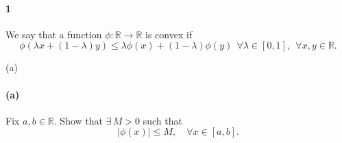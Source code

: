 \documentclass[12pt]{article}
\newenvironment{fullbox}{\begin{lrbox}{\savefullbox}\begin{minipage}{\dimexpr\textwidth-2\fboxsep\relax}}{\end{minipage}\end{lrbox}\begin{center}\framebox[\textwidth]{\usebox{\savefullbox}}\end{center}}
\newenvironment{pbox}[1][]{\begin{fullbox}\ifx#1\empty\else\paragraph{#1}\fi}{\end{fullbox}}
\theoremstyle{definition}
\newcommand{\R}{\mathbb{R}}
\begin{document}
\thispagestyle{title}


\begin{pbox}[1]
    We say that a function $\phi:\mathbb{R} \to \mathbb{R}$ is convex if
    \begin{equation}
     \phi(\lambda x + (1-\lambda)y) \le \lambda \phi(x) + (1-\lambda) \phi(y)\ \ \forall \lambda \in [0,1],\ \ \forall x, y \in \mathbb{R}.
    \end{equation}
\end{pbox}

\begin{pbox}[(a)]
    Fix $a, b \in \R$. Show that $\exists\,M>0$ such that 
    \begin{equation}
    |\phi(x)| \le M,\quad \forall x \in [a,b].
    \end{equation}
\end{pbox}
\end{document}
